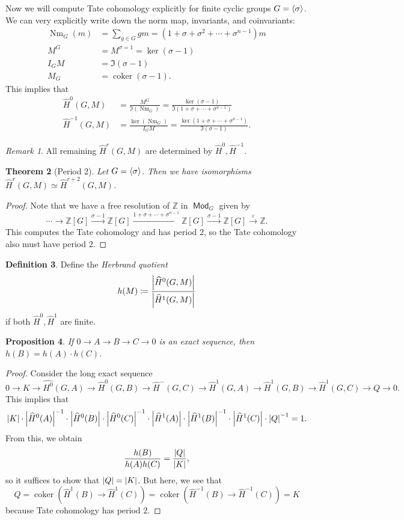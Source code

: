 \documentclass[leqno, openany]{memoir}
\newtheorem{thm}{Theorem}[section]
\newtheorem{prop}[thm]{Proposition}
\theoremstyle{definition}
\newtheorem{defn}[thm]{Definition}
\theoremstyle{remark}
\newtheorem{rmk}[thm]{Remark}
\theoremstyle{plain}
\theoremstyle{definition}
\theoremstyle{remark}
\newcommand{\Z}{\mathbb{Z}}
\newcommand{\ep}{\varepsilon}
\newcommand{\wh}[1]{\widehat{#1}}
\DeclareMathOperator{\Mod}{\mathsf{Mod}}
\DeclareMathOperator{\Nm}{Nm}
\DeclareMathOperator{\coker}{coker}
\begin{document}
Now we will compute Tate cohomology explicitly for finite cyclic groups $G =
\ev{\sigma}$. We can very explicitly write down the norm map, invariants, and
coinvariants: \begin{align*} \Nm_G(m) &= \sum_{g \in G} g m = (1 + \sigma +
    \sigma^2 + \cdots + \sigma^{n-1}) m \\ M^G &= M^{\sigma = 1} = \ker (\sigma
    - 1) \\ I_G M &= \Im (\sigma - 1) \\ M_G &= \coker (\sigma - 1).
    \end{align*} This implies that \begin{align*} \wh{H}^0(G, M) &=
    \frac{M^G}{\Im (\Nm_G)} = \frac{\ker (\sigma - 1)}{\Im (1 + \sigma + \cdots
    + \sigma^{n-1})} \\ \wh{H}^{-1}(G, M) &= \frac{\ker (\Nm_G)}{I_G M} =
\frac{\ker (1+ \sigma + \cdots + \sigma^{n-1})}{\Im (\sigma - 1)}.
\end{align*}

\begin{rmk} All remaining $\wh{H}^r(G, M)$ are determined by $\wh{H}^0,
\wh{H}^{-1}$.  \end{rmk}

\begin{thm}[Period $2$] Let $G = \ev{\sigma}$. Then we have isomorphisms
$\wh{H}^r(G, M) \simeq \wh{H}^{r+2}(G, M)$.  \end{thm}

\begin{proof} Note that we have a free resolution of $\Z$ in $\Mod_G$ given by
    \[ \cdots \to \Z[G] \xrightarrow{\sigma - 1} \Z[G] \xrightarrow{1 + \sigma
    + \cdots + \sigma^{n-1}} \Z[G] \xrightarrow{\sigma - 1} \Z[G]
\xrightarrow{\ep} \Z. \] This computes the Tate cohomology and has period $2$,
so the Tate cohomology also must have period $2$.  \end{proof}

\begin{defn} Define the \textit{Herbrand quotient} \[ h(M) \coloneqq
\frac{\abs{\wh{H}^0(G, M)}}{\abs{\wh{H}^1(G, M)}} \] if both $\wh{H}^0,
\wh{H}^1$ are finite.  \end{defn}

\begin{prop} If $0 \to A \to B \to C \to 0$ is an exact sequence, then $h(B) =
h(A) \cdot h(C)$.  \end{prop}

\begin{proof} Consider the long exact sequence \[ 0 \to K \to \wh{H^0}(G, A)
    \to \wh{H}^0(G, B) \to \wh{H}^-(G, C) \to \wh{H}^1(G, A) \to \wh{H}^1(G, B)
    \to \wh{H}^1(G, C) \to Q \to 0. \] This implies that \[ \abs{K} \cdot
\abs{\wh{H}^0(A)}^{-1} \cdot \abs{\wh{H}^0(B)} \cdot \abs{\wh{H}^0(C)}^{-1}
\cdot \abs{\wh{H}^1(A)} \cdot \abs{\wh{H}^1(B)}^{-1} \cdot \abs{\wh{H}^1(C)}
\cdot \abs{Q}^{-1} = 1. \] From this, we obtain \[ \frac{h(B)}{h(A)h(C)} =
\frac{\abs{Q}}{\abs{K}}, \] so it suffices to show that $\abs{Q} = \abs{K}$.
But here, we see that \[ Q = \coker (\wh{H}^1(B) \to \wh{H}^1(C)) = \coker
(\wh{H}^{-1}(B) \to \wh{H}^{-1}(C)) = K \] because Tate cohomology has period
$2$.  \end{proof}
\end{document}
